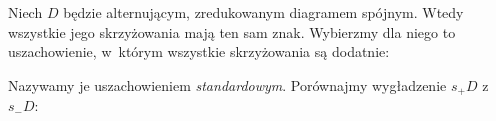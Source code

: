 Niech $D$ będzie alternującym, zredukowanym diagramem spójnym.
Wtedy wszystkie jego skrzyżowania mają ten sam znak.
Wybierzmy dla niego to uszachowienie, w~którym wszystkie skrzyżowania są dodatnie:
\begin{comment}
\[
    \begin{tikzpicture}[baseline=-0.65ex,scale=0.15]
    \begin{knot}[clip width=5]
        \strand[thick] (-25, 0) to (25, 0);
        \strand[thick] (10*0-15, -5) to (10*0-15, 5);
        \strand[thick] (10*1-15, -5) to (10*1-15, 5);
        \strand[thick] (10*2-15, -5) to (10*2-15, 5);
        \strand[thick] (10*3-15, -5) to (10*3-15, 5);
        \draw[fill=diagramfiller,draw=none] (-25, 0) rectangle (-15, -5);
        \draw[fill=diagramfiller,draw=none] (-15, 0) rectangle (-5, 5);
        \draw[fill=diagramfiller,draw=none] (-5, 0) rectangle (5, -5);
        \draw[fill=diagramfiller,draw=none] (5, 0) rectangle (15, 5);
        \draw[fill=diagramfiller,draw=none] (15, 0) rectangle (25, -5);
        \node[above left] at (-15, 0) {$+1$};
        \node[above left] at (5, 0) {$+1$};
        \node[below left] at (-5, 0) {$+1$};
        \node[below left] at (15, 0) {$+1$};
    \end{knot}
    \end{tikzpicture}
\]
\end{comment}
Nazywamy je uszachowieniem \emph{standardowym}.
%
Porównajmy wygładzenie $s_+D$ z~$s_-D$:
\begin{comment}
\[
    \begin{tikzpicture}[baseline=-0.65ex,scale=0.10]
        \node at (0, 8) {$s_+D$};
        \draw[fill=diagramfiller,draw=none] (-25, -5) rectangle (25, 5);
        \draw[fill=white, draw=none] (-15, -5) [in=left, out=up] to (-12, 0) -- (-8, 0) [in=up, out=right] to (-5, -5);
        \draw[fill=white, draw=none] (5, -5) [in=left, out=up] to (8, 0) -- (12, 0) [in=up, out=right] to (15, -5);
        \draw[fill=white, draw=none] (-5, 5) [in=left, out=down] to (-2, 0) -- (2, 0) [in=down, out=right] to (5, 5);
        \draw[fill=white, draw=none] (-25, 0) -- (-18, 0) [in=down, out=right] to (-15, 5) -- (-25, 5);
        \draw[fill=white, draw=none] ( 25, 0) -- ( 18, 0) [in=down, out=left] to ( 15, 5) -- ( 25, 5);
    \end{tikzpicture}
    \quad
    \begin{tikzpicture}[baseline=-0.65ex,scale=0.10]
        \node at (0, 8) {$s_-D$};
        \draw[fill=diagramfiller, draw=none] (-15, 5) [in=left, out=up] to (-12, 0) -- (-8, 0) [in=up, out=right] to (-5, 5);
        \draw[fill=diagramfiller, draw=none] (5, 5) [in=left, out=up] to (8, 0) -- (12, 0) [in=up, out=right] to (15, 5);
        \draw[fill=diagramfiller, draw=none] (-5, -5) [in=left, out=down] to (-2, 0) -- (2, 0) [in=down, out=right] to (5, -5);
        \draw[fill=diagramfiller, draw=none] (-25, 0) -- (-18, 0) [in=down, out=right] to (-15, -5) -- (-25, -5);
        \draw[fill=diagramfiller, draw=none] ( 25, 0) -- ( 18, 0) [in=down, out=left] to ( 15, -5) -- ( 25, -5);
    \end{tikzpicture}
\]
\end{comment}


